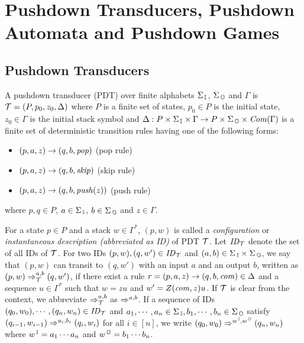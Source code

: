 \section{Pushdown Transducers, Pushdown Automata and Pushdown Games}
\subsection{Pushdown Transducers}
\begin{definition}
A {pushdown transducer} (PDT)
over finite alphabets $\Sigma_{\, \mathbb{I}}$, $\Sigma_{\, \mathbb{O}}$ and $\Gamma$
is ${\cal T}=(P, p_0, z_0, \Delta)$ where
$P$ is a finite set of states,
$p_0\in P$ is the initial state,
$z_0\in \Gamma$ is the initial stack symbol and
$\Delta: P\times \Sigma_{\, \mathbb{I}} \times \Gamma \to P\times \Sigma_{\, \mathbb{O}} \times \mathit{Com}(\Gamma)$ is a finite set of deterministic transition rules having one of the following forms:
\begin{itemize}
\item $(p, a, z) \rightarrow (q, b, \mathit{pop})$ \quad (pop rule)
\item $(p, a, z) \rightarrow (q, b, \mathit{skip})$ \quad (skip rule)
\item $(p, a, z) \rightarrow (q, b, \mathit{push}(z))$ \quad (push rule)
\end{itemize}
where $p, q\in P$, $a\in\Sigma_{\, \mathbb{I}}$, $b\in\Sigma_{\, \mathbb{O}}$ and $z\in\Gamma$.
\end{definition}
\noindent
For a state $p\in P$ and
a stack $w \in \Gamma^*$,
$(p, w)$ is called
a {\em configuration} or {\em instantaneous description (abbreviated as ID)} of PDT ${\cal T}$. Let $\mathit{ID}_{\cal T}$ denote the set of all IDs of ${\cal T}$.
For two IDs $(p, w), (q, w')\in \mathit{ID}_\mathcal{T}$ and $(a,b)\in\Sigma_{\, \mathbb{I}} \times \Sigma_{\, \mathbb{O}}$,
we say that $(p, w)$ can transit to $(q, w')$ with an input $a$ and an output $b$, written as $(p, w) \Rightarrow_{{\cal T}}^{a, b} (q, w')$, if there exist a rule $r=(p, a, z) \rightarrow (q, b, \mathit{com}) \in \Delta$ and a sequence $u\in \Gamma^*$ such that $w=zu$ and $w'=Z(\mathit{com},z)u$.
If ${\cal T}$ is clear from the context,
we abbreviate
$\Rightarrow_{{\cal T}}^{a, b}$ as $\Rightarrow^{a, b}$.
If a sequence of IDs $(q_0, w_0), \cdots, (q_n, w_n)\in \mathit{ID}_{\cal T}$
and $a_1, \cdots, a_n\in\Sigma_{\, \mathbb{I}}, b_1, \cdots, b_n\in \Sigma_{\, \mathbb{O}}$ satisfy $(q_{i-1}, w_{i-1})\Rightarrow^{a_i, b_i}(q_i, w_i)$ for all $i\in[n]$, we write $(q_0, w_0)\Rightarrow^{w^{\, \mathbb{I}}, w^{\, \mathbb{O}}}(q_n, w_n)$
where $w^{\, \mathbb{I}} = a_1 \cdots a_n$ and $w^{\, \mathbb{O}} = b_1 \cdots b_n$.

